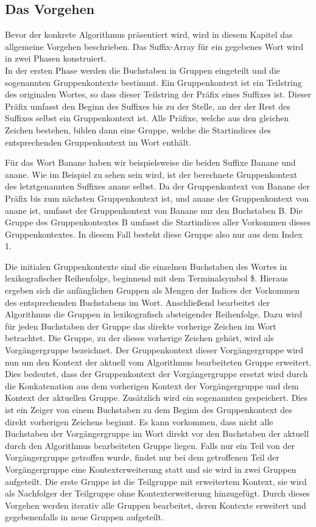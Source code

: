 \newpage
\subsection{Das Vorgehen}
\label{gsaca:chapter2}
%
Bevor der konkrete Algorithmus präsentiert  wird, wird in diesem Kapitel das allgemeine Vorgehen beschrieben. 
Das Suffix-Array für ein gegebenes Wort wird in zwei Phasen konstruiert.\\

In der ersten Phase werden die Buchstaben in Gruppen eingeteilt und die sogenannten Gruppenkontexte bestimmt.
Ein Gruppenkontext ist ein Teilstring des originalen Wortes, so dass dieser Teilstring der Präfix eines Suffixes ist. 
Dieser Präfix umfasst den Beginn des Suffixes bis zu der Stelle, an der der Rest des Suffixes selbst ein Gruppenkontext ist. 
Alle Präfixe, welche aus den gleichen Zeichen bestehen, bilden dann eine Gruppe, welche die Startindices des entsprechenden Gruppenkontext im Wort enthält.

Für das Wort Banane haben wir beispielsweise die beiden Suffixe Banane und anane. 
Wie im Beispiel zu sehen sein wird, ist der berechnete Gruppenkontext des letztgenannten Suffixes anane selbst. 
Da der Gruppenkontext von Banane der Präfix bis zum nächsten Gruppenkontext ist, und anane der Gruppenkontext von anane ist, umfasst der Gruppenkontext von Banane nur den Buchstaben B. 
Die Gruppe des Gruppenkontextes B umfasst die Startindices aller Vorkommen dieses Gruppenkontextes.
In diesem Fall besteht diese Gruppe also nur aus dem Index 1.

Die initialen Gruppenkontexte sind die einzelnen Buchstaben des Wortes in lexikografischer Reihenfolge, beginnend mit dem Terminalsymbol \$.
Hieraus ergeben sich die anfänglichen Gruppen als Mengen der Indices der Vorkommen des entsprechenden Buchstabens im Wort.
Anschließend bearbeitet der Algorithmus die Gruppen in lexikografisch absteigender Reihenfolge. 
Dazu wird für jeden Buchstaben der Gruppe das direkte vorherige Zeichen im Wort betrachtet.
Die Gruppe, zu der dieses vorherige Zeichen gehört, wird als Vorgängergruppe bezeichnet.
Der Gruppenkontext dieser Vorgängergruppe wird nun um den Kontext der aktuell vom Algorithmus bearbeiteten Gruppe erweitert.
Dies bedeutet, dass der Gruppenkontext der Vorgängergruppe ersetzt wird durch die Konkatenation aus dem vorherigen Kontext der Vorgängergruppe und dem Kontext der aktuellen Gruppe.
Zusätzlich wird ein sogenannten \prevpointer gespeichert.
Dies ist ein Zeiger von einem Buchstaben zu dem Beginn des Gruppenkontext des direkt vorherigen Zeichens beginnt.
Es kann vorkommen, dass nicht alle Buchstaben der Vorgängergruppe im Wort direkt vor den Buchstaben der aktuell durch den Algorithmus bearbeiteten Gruppe liegen.
Falls nur ein Teil von der Vorgängergruppe getroffen wurde, findet nur bei dem getroffenen Teil der Vorgängergruppe eine Kontexterweiterung statt und sie wird in zwei Gruppen aufgeteilt.
Die erste Gruppe ist die Teilgruppe mit erweitertem Kontext, sie wird als Nachfolger der Teilgruppe ohne Kontexterweiterung hinzugefügt. 
Durch dieses Vorgehen werden iterativ alle Gruppen bearbeitet, deren Kontexte erweitert und gegebenenfalls in neue Gruppen aufgeteilt.\\

